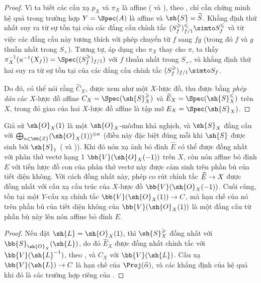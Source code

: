 \documentclass[oneside,10pt]{amsart}
\makeatletter
\renewcommand{\leq}{\leqslant}
\renewcommand{\geq}{\geqslant}
\newcommand{\ega@arrow}[2]{\mathchoice{#1}{#2}{#2}{#2}}
\renewcommand{\to}{\ega@arrow{\longrightarrow}{\rightarrow}}
\let\EGAOriginalLabel\label
\renewcommand{\label}[1]{\phantomsection\EGAOriginalLabel{#1}}
\makeatother
\begin{document}
\begin{proof}
Vì ta biết các cấu xạ $p_X$ và $\pi_X$ là affine ( và ), theo , chỉ cần chứng minh hệ quả trong trường hợp $Y=\Spec(A)$ là affine và $\sh{S}=\widetilde{S}$.
Khẳng định thứ nhất suy ra từ sự tồn tại của các đẳng cấu chính tắc  $(S_f^\geq)_{f/1}^\leq \simto S_f^\leq$ và từ việc các đẳng cấu này tương thích với phép chuyển từ $f$ sang $fg$ (trong đó $f$ và $g$ thuần nhất trong $S_+$).
Tương tự, áp dụng  cho $\pi_X$ thay cho $\pi$, ta thấy $\pi_X^{-1}(u^{-1}(X_f)) = \Spec((S_f^\geq)_{f/1})$ với $f$ thuần nhất trong $S_+$, và khẳng định thứ hai suy ra từ sự tồn tại của các đẳng cấu chính tắc  $(S_f^\geq)_{f/1} \simto S_f$.

Do đó, có thể nói rằng $\widehat{C}_X$, được xem như một $X$-lược đồ, thu được bằng \emph{phép dán} các $X$-lược đồ affine $C_X=\Spec(\sh{S}_X^\geq)$ và $\widehat{E}_X=\Spec(\sh{S}_X^\leq)$ trên $X$, trong đó giao của hai $X$-lược đồ affine là tập mở $E_X=\Spec(\sh{S}_X)$.
\end{proof}
\begin{corollary}[8.6.4]
\label{II.8.6.4}
Giả sử $\sh{O}_X(1)$ là một $\sh{O}_X$-môđun khả nghịch, và $\sh{S}_X$ đẳng cấu với $\bigoplus_{n\in\bb{Z}}(\sh{O}_X(1))^{\otimes n}$ (điều này đặc biệt đúng mỗi khi $\sh{S}$ được sinh bởi $\sh{S}_1$ ( và )).
Khi đó nón xạ ảnh bỏ đỉnh $\widehat{E}$ có thể được đồng nhất với phân thớ vectơ hạng 1 $\bb{V}(\sh{O}_X(-1))$ trên $X$, còn nón affine bỏ đỉnh $E$ với tiền lược đồ con của phân thớ vectơ này được cảm sinh trên phần bù của tiết diện không.
Với cách đồng nhất này, phép co rút chính tắc $\widehat{E}\to X$ được đồng nhất với cấu xạ cấu trúc của $X$-lược đồ $\bb{V}(\sh{O}_X(-1))$.
Cuối cùng, tồn tại một $Y$-cấu xạ chính tắc $\bb{V}(\sh{O}_X(1))\to C$, mà hạn chế của nó trên phần bù của tiết diện không của $\bb{V}(\sh{O}_X(1))$ là một đẳng cấu từ phần bù này lên nón affine bỏ đỉnh $E$.
\end{corollary}

\begin{proof}
Nếu đặt $\sh{L}=\sh{O}_X(1)$, thì $\sh{S}_X^\geq$ đồng nhất với $\bb{S}_{\sh{O}_X}(\sh{L})$, do đó $\widehat{E}_X$ được đồng nhất chính tắc với $\bb{V}(\sh{L}^{-1})$, theo , và $C_X$ với $\bb{V}(\sh{L})$.
Cấu xạ $\bb{V}(\sh{L})\to C$ là hạn chế của $\Proj(\widehat{\alpha})$, và các khẳng định của hệ quả khi đó là các trường hợp riêng của .
\end{proof}
\end{document}
